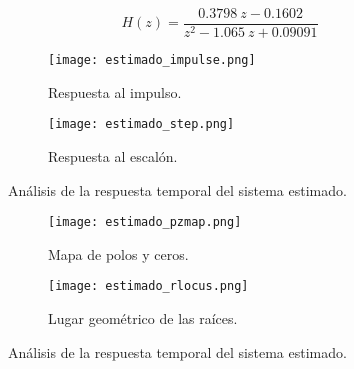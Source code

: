\vspace{-0.5cm}
\begin{equation}
    H(z) = \dfrac{0.3798\ z - 0.1602}{z^2 - 1.065\ z + 0.09091}
\end{equation}
\vspace{-0.5cm}

\begin{figure}[H]
    \centering

    \begin{subfigure}[b]{0.49\textwidth}
        \centering
        \texttt{[image: estimado\_impulse.png]}
        \caption{Respuesta al impulso.}
        \label{fig:estimado_impulse}
    \end{subfigure}
    \begin{subfigure}[b]{0.49\textwidth}
        \centering
        \texttt{[image: estimado\_step.png]}
        \caption{Respuesta al escalón.}
        \label{fig:estimado_step}
    \end{subfigure}

    \vspace{-0.25cm}
    \caption{Análisis de la respuesta temporal del sistema estimado.}
    \label{fig:estimado_respuestas}
\end{figure}
\vspace{-0.5cm}

\begin{figure}[H]
    \centering

    \begin{subfigure}[b]{0.49\textwidth}
        \centering
        \texttt{[image: estimado\_pzmap.png]}
        \caption{Mapa de polos y ceros.}
        \label{fig:estimado_pzmap}
    \end{subfigure}
    \begin{subfigure}[b]{0.49\textwidth}
        \centering
        \texttt{[image: estimado\_rlocus.png]}
        \caption{Lugar geométrico de las raíces.}
        \label{fig:estimado_rlocus}
    \end{subfigure}

    \vspace{-0.25cm}
    \caption{Análisis de la respuesta temporal del sistema estimado.}
    \label{fig:estimado_estabilidad}
\end{figure}
\vspace{-0.5cm}
